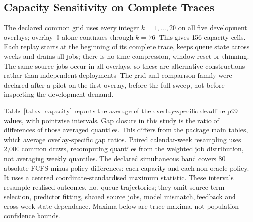 \documentclass[mathematics,supfile,submit,moreauthors]{Definitions/mdpi}
\newcommand{\devnum}[1]{#1}
\begin{document}
\subsection{Capacity Sensitivity on Complete Traces}

The declared common grid uses every integer $k=\devnum{1},\ldots,\devnum{20}$
on all five development overlays; overlay~\devnum{0} alone continues through
$k=\devnum{76}$. This gives \devnum{156} capacity cells. Each replay starts at the
beginning of its complete trace, keeps queue state across weeks and drains all jobs;
there is no time compression, window reset or thinning. The same source jobs occur
in all overlays, so these are alternative constructions rather than independent
deployments. The grid and comparison family were declared after a pilot on the
first overlay, before the full sweep, not before inspecting the development demand.

Table~\ref{tab:s_capacity} reports the average of the overlay-specific deadline
p99 values, with pointwise intervals. Gap closure in this study is the ratio of
differences of those averaged quantiles. This differs from the package main tables,
which average overlay-specific gap ratios. Paired calendar-week resampling uses
\devnum{2{,}000} common draws, recomputing quantiles from the weighted job
distribution, not averaging weekly quantiles. The declared simultaneous band
covers \devnum{80} absolute FCFS-minus-policy differences: each capacity and each
non-oracle policy. It uses a centred coordinate-standardised maximum statistic.
These intervals resample realised outcomes, not queue trajectories; they omit
source-term selection, predictor fitting, shared source jobs, model mismatch,
feedback and cross-week state dependence. Maxima below are trace maxima, not
population confidence bounds.
\end{document}
